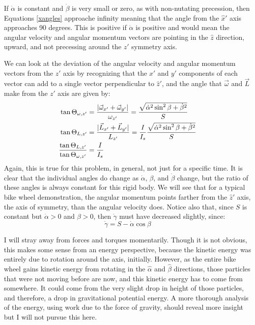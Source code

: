 \documentclass[10pt]{article}
\begin{document}
If $\dot\alpha$ is constant and $\dot\beta$ is 
very small or zero, as with non-nutating precession, then Equations 
\ref{xangles} approache infinity meaning that the angle from the $\hat{x}'$ 
axis approaches 90 degrees. This is positive if $\dot\alpha$ is positive and 
would mean the angular velocity and angular momentum vectors are 
pointing in the $\hat{z}$ direction, upward, and not precessing around 
the $\hat{z}'$ symmetry axis.

We can look at the deviation 
of the angular velocity and angular momentum vectors from the $\hat{z}'$ axis 
by recognizing that the $x'$ and $y'$ components of each 
vector can add to a single vector perpendicular to $\hat{z}'$, and the 
angle that $\vec{\omega}$ and $\vec{L}$ make from the $\hat{z}'$ axis 
are given by:
\begin{align}
    \tan\Theta_{\omega,z'} &= 
        \frac{|\vec{\omega}_{x'}+\vec{\omega}_{y'}|}{\omega_{z'}} = 
        \frac{\sqrt{\dot\alpha^2\sin^2\beta+\dot\beta^2}}{S} 
        \notag \\
    \tan\Theta_{L,z'} &= 
        \frac{|\vec{L}_{x'}+\vec{L}_{y'}|}{L_{z'}} = 
        \frac{I}{I_s}\frac{\sqrt{\dot\alpha^2\sin^2\beta+\dot\beta^2}}{S} 
        \notag \\
    \frac{\tan\Theta_{L,z'}}{\tan\Theta_{\omega,z'}} &=\frac{I}{I_s} 
        \label{zangles}
\end{align}
Again, this is true for this problem, in general, not just for a 
specific time. It is clear that the individual angles do change as 
$\dot\alpha$, $\beta$, and $\dot\beta$ change, but the ratio of these 
angles is always constant for this rigid body. We will see that 
for a typical bike wheel demonstration, the angular momentum points 
farther from the $\hat{z}'$ axis, the axis of symmetry, than the 
angular velocity does. Notice also that, 
since $S$ is constant but $\dot\alpha>0$ and $\beta>0$, then $\dot\gamma$ 
must have decreased slightly, since:
\begin{equation*}
    \dot\gamma = S - \dot\alpha\cos\beta
\end{equation*}

I will stray away from forces and torques momentarily. 
Though it is not obvious, this makes some sense
from an energy perspective, because the kinetic energy was entirely 
due to rotation around the axis, initially. However, as the entire 
bike wheel gains kinetic energy from rotating in the $\hat{\alpha}$ and 
$\hat{\beta}$ directions, those particles that were not 
moving before are now, and this kinetic energy has to come from somewhere.
It could come from the very slight drop in height of those particles, 
and therefore, a drop in gravitational potential energy. A more thorough 
analysis of the energy, using work due to the force of gravity, 
should reveal more insight but I will not pursue this here.
\end{document}
